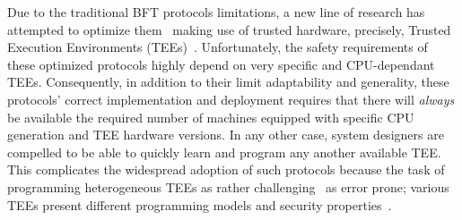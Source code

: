 


 Due to the traditional BFT protocols limitations, a new line of research has attempted to optimize them~\cite{10.1145/3492321.3519568, minBFT, hybster, 10.1145/2168836.2168866, DBLP:journals/corr/LiuLKA16a, trinc} making use of trusted hardware, precisely, Trusted Execution Environments (TEEs)~\cite{cryptoeprint:2016:086, arm-realm, amd-sev, riscv-multizone, intelTDX}. Unfortunately, the safety requirements of these optimized protocols highly depend on very specific and CPU-dependant TEEs. Consequently, in addition to their limit adaptability and generality, these protocols' correct implementation and deployment requires that there will {\em always} be available the required number of machines equipped with specific CPU generation and TEE hardware versions. In any other case, system designers are compelled to be able to quickly learn and program any another available TEE. This complicates the widespread adoption of such protocols because the task of programming heterogeneous TEEs as rather challenging~\cite{10.1145/3460120.3485341} as error prone; various TEEs present different programming models and security properties~\cite{10.1007/978-3-031-16092-9_7}. %



